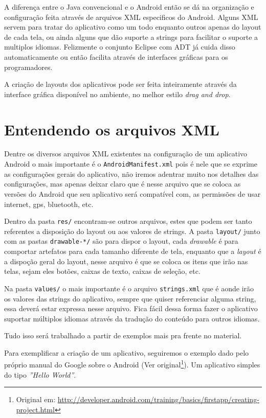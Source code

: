 \documentclass[a4paper,12pt,brazil,doubleside]{book}
\begin{document}
A diferença entre o Java convencional e o Android então se dá na organização e configuração feita através de arquivos XML especificos do Android. Alguns XML servem para tratar do aplicativo como um todo enquanto outros apenas do layout de cada tela, ou ainda alguns que dão suporte a strings para facilitar o suporte a multiplos idiomas.
Felizmente o conjunto Eclipse com ADT já cuida disso automaticamente ou então facilita através de interfaces gráficas para os programadores.

A criação de layouts dos aplicativos pode ser feita inteiramente através da interface gráfica disponível no ambiente, no melhor estilo \textit{drag and drop}. 

\section{Entendendo os arquivos XML}
Dentre os diversos arquivos XML existentes na configuração de um aplicativo Android o mais importante é o \texttt{\textcolor{mygreen}{AndroidManifest.xml}} pois é nele que se exprime as configurações gerais do aplicativo, não iremos adentrar muito nos detalhes das configurações, mas apenas deixar claro que é nesse arquivo que se coloca as versões do Android que seu aplicativo será compatível com, as permissões de usar internet, gps, bluetooth, etc. 

Dentro da pasta \texttt{\textcolor{mygreen}{res/}} encontram-se outros arquivos, estes que podem ser tanto referentes a disposição do layout ou aos valores de strings. A pasta \texttt{\textcolor{mygreen}{layout/}} junto com as pastas \texttt{\textcolor{mygreen}{drawable-*/}} são para dispor o layout, cada \textit{drawable} é para comportar artefatos para cada tamanho diferente de tela, enquanto que a \textit{layout} é a dispoção geral do layout, nesse arquivo é que se coloca os itens que irão nas telas, sejam eles botões, caixas de texto, caixas de seleção, etc.

Na pasta \texttt{\textcolor{mygreen}{values/}} o mais importante é o arquivo \texttt{\textcolor{mygreen}{strings.xml}} que é aonde irão os valores das strings do aplicativo, sempre que quiser referenciar alguma string, essa deverá estar expressa nesse arquivo. Fica fácil dessa forma fazer o aplicativo suportar múltiplos idiomas através da tradução do conteúdo para outros idiomas. 

Tudo isso será trabalhado a partir de exemplos mais pra frente no material.


Para exemplificar a criação de um aplicativo, seguiremos o exemplo dado pelo próprio manual do Google sobre o Android (Ver original\footnote{Original em: \href{http://developer.android.com/training/basics/firstapp/creating-project.html}{http://developer.android.com/training/basics/firstapp/creating-project.html}}). Um aplicativo simples do tipo \textit{''Hello World''}.
\end{document}
